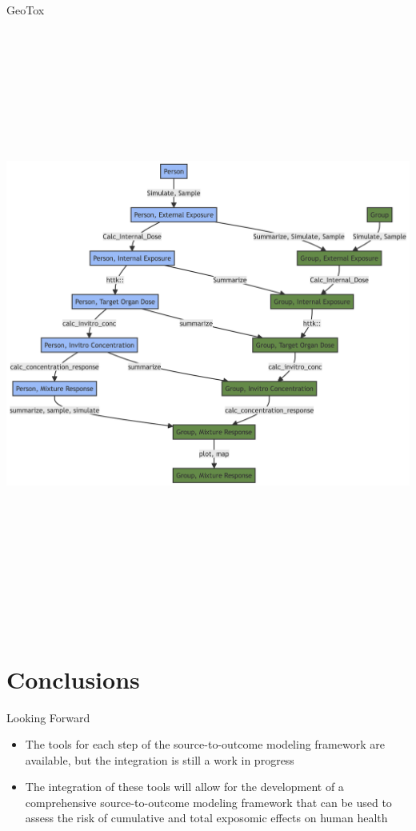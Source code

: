 \documentclass[
  ignorenonframetext,
]{beamer}
\begin{document}
\begin{frame}[shrink]{GeoTox}
\label{geotox-3}
\includegraphics[width=9.87in,height=7.95in]{pegs_retreat_set_group_files/figure-beamer/mermaid-figure-1.png}
\end{frame}

\section{Conclusions}\label{conclusions}

\begin{frame}{Looking Forward}
\label{looking-forward}
\begin{itemize}
\item
  The tools for each step of the source-to-outcome modeling framework
  are available, but the integration is still a work in progress
\item
  The integration of these tools will allow for the development of a
  comprehensive source-to-outcome modeling framework that can be used to
  assess the risk of cumulative and total exposomic effects on human
  health
\end{itemize}
\end{frame}
\end{document}
